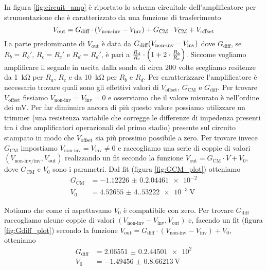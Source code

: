 \documentclass[
    prl,
    reprint, 
    superscriptaddress, 
    altaffilletter, 
    amsmath, 
    amssymb, 
    a4paper,
    varvw]{revtex4-2}
\begin{document}
In figura \ref{fig:circuit_amp} è riportato lo schema circuitale dell'amplificatore per strumentazione che  è caratterizzato da una funzione di trasferimento \begin{equation}
    V_\text{out} = G_\text{diff}\cdot \qty(V_\text{non-inv}-V_\text{inv}) +  G_\text{CM}\cdot V_\text{CM} + V_\text{offset} 
\end{equation}
La parte predominante di $V_\text{out}$ è data da $G_\text{diff}\qty(V_\text{non-inv}-V_\text{inv})$ dove $G_\text{diff}$, se $R_b=R_b'$, $R_c=R_c'$ e $R_d=R_d'$, è pari a $\frac{R_{d}}{R_{c}}\cdot \qty(1+2\cdot \frac{R_{b}}{R_{a}})$. Siccome vogliamo amplificare il segnale in uscita dalla sonda di circa 200 volte scegliamo resitenze da \SI{1}{\kilo\ohm} per $R_a$, $R_c$ e da \SI{10}{\kilo\ohm} per $R_b$ e $R_d$. Per caratterizzare l'amplificatore è necessario trovare quali sono gli effettivi valori di $V_\text{offset}$, $G_\text{CM}$ e $G_\text{diff}$. 
Per trovare $V_\text{offset}$ fissiamo $V_\text{non-inv}=V_\text{inv}=0$ e osserviamo che il valore misurato è nell'ordine dei \si{\milli\volt}. Per far diminuire ancora di più questo valore possiamo utilizzare un trimmer (una resistenza variabile che corregge le differenze di impedenza presenti tra i due amplificatori operazionali del primo stadio) presente sul circuito stampato in modo che $V_\text{offset}$ sia più prossimo possibile a zero.
Per trovare invece $G_\text{CM}$ impostiamo $V_\text{non-inv}=V_\text{inv}\neq 0$ e raccogliamo una serie di coppie di valori $(V_\text{non-inv/inv},V_\text{out})$ realizzando un fit secondo la funzione $V_\text{out}=G_\text{CM}\cdot V+V_0$, dove $G_\text{CM}$ e $V_0$ sono i parametri. Dal fit (figura \ref{fig:GCM_plot}) otteniamo \begin{align*}
    G_\text{CM} &= \num{-1.12226(0.204461)e-2}\\
    V_0 &= \SI{4.52655(4.53222)e-3}{\volt}
\end{align*}

Notiamo che come ci aspettavamo $V_0$ è compatibile con zero.
Per trovare $G_\text{diff}$  raccogliamo alcune coppie di valori $(V_\text{non-inv}-V_\text{inv},V_\text{out})$ e, facendo un fit (figura \ref{fig:Gdiff_plot}) secondo la funzione $V_\text{out}=G_\text{diff}\cdot (V_\text{non-inv}-V_\text{inv})+V_0$, otteniamo \begin{align*}
    G_\text{diff} &= \num{2.06551(0.244501)e2}\\
    V_0 &= \SI{-1.49456(0.866213)}{\volt}
\end{align*}
\end{document}
